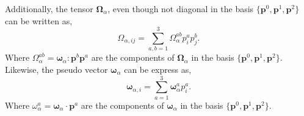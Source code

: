Additionally, the tensor $\bm\Omega_\alpha$, even though not diagonal in the basis  $\{\textbf{p}^0, \textbf{p}^1, \textbf{p}^2\}$ can be written as, 
\begin{equation*}
    \Omega_{\alpha,ij}
    = 
    \sum_{a,b=1}^3
    \Omega^{ab}_\alpha p_i^ap_j^b. 
\end{equation*}
Where $\Omega_\alpha^{ab} = \bm\omega_\alpha : \textbf{p}^b\textbf{p}^a$ are the components of $\bm\Omega_\alpha$ in the basis $\{\textbf{p}^0, \textbf{p}^1, \textbf{p}^2\}$. 
Likewise, the pseudo vector $\bm\omega_\alpha$ can be express as, 
\begin{equation*}
    \bm\omega_{\alpha,i}
    = 
    \sum_{a=1}^3
    \bm\omega_\alpha^a p_i^a. 
\end{equation*}
Where $\omega_\alpha^a = \bm\omega_\alpha \cdot \textbf{p}^a$ are the components of $\bm\omega_\alpha$ in the basis $\{\textbf{p}^0, \textbf{p}^1, \textbf{p}^2\}$. 




